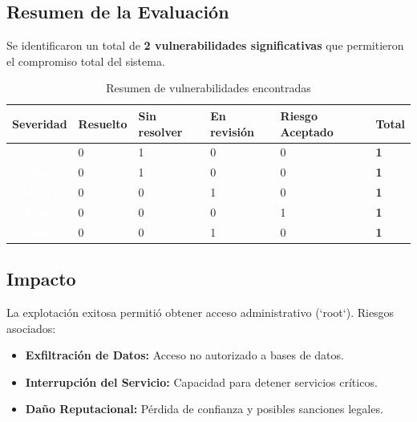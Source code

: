 \documentclass[a4paper]{article}
\begin{document}
\subsection*{Resumen de la Evaluación}
Se identificaron un total de \textbf{2 vulnerabilidades significativas} que permitieron el compromiso total del sistema.

\begin{table}[H]
    \centering
    \setlength{\tabcolsep}{12pt}
    \begin{tabularx}{\textwidth}{c Y Y Y Y Y} 
        \toprule
        \textbf{Severidad} & 
        \textbf{Resuelto} & 
        \textbf{Sin resolver} & 
        \textbf{En revisión} & 
        \textbf{Riesgo Aceptado} & 
        \textbf{Total} \\ 
        \midrule

        \textcolor{white}{\textbf{Crítico}} & 
        0 & 1 & 0 & 0 & \textbf{1} \\ 
        \addlinespace[0.2cm]

        \textcolor{white}{\textbf{Alto}} & 
        0 & 1 & 0 & 0 & \textbf{1} \\ 
        \addlinespace[0.2cm]

        \textcolor{white}{\textbf{Medio}} & 
        0 & 0 & 1 & 0 & \textbf{1} \\ 
        \addlinespace[0.2cm]
        
        \textcolor{white}{\textbf{Bajo}} & 
        0 & 0 & 0 & 1 & \textbf{1} \\ 
        \addlinespace[0.2cm]

        \textcolor{white}{\textbf{Info}} & 
        0 & 0 & 1 & 0 & \textbf{1} \\ 
        \bottomrule

    \end{tabularx}
    \caption{Resumen de vulnerabilidades encontradas}
\end{table}

\subsection*{Impacto}
La explotación exitosa permitió obtener acceso administrativo (`root`). Riesgos asociados:
\begin{itemize}
    \item \textbf{Exfiltración de Datos:} Acceso no autorizado a bases de datos.
    \item \textbf{Interrupción del Servicio:} Capacidad para detener servicios críticos.
    \item \textbf{Daño Reputacional:} Pérdida de confianza y posibles sanciones legales.
\end{itemize}
\end{document}

